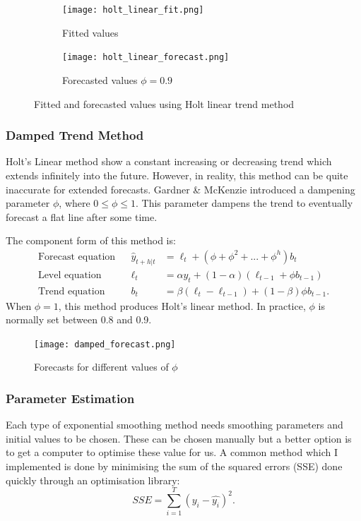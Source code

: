 \documentclass{article}
\begin{document}
  \begin{figure}[H]
    \centering
    \captionsetup{justification=centering}
    \begin{subfigure}[b]{0.49\linewidth}
      \texttt{[image: holt\_linear\_fit.png]}
      \caption{Fitted values}
    \end{subfigure}
    \begin{subfigure}[b]{0.49\linewidth}
      \texttt{[image: holt\_linear\_forecast.png]}
      \caption{Forecasted values $\phi=0.9$}
    \end{subfigure}
    \caption{Fitted and forecasted values using Holt linear trend method}
  \end{figure}

  \subsubsection*{Damped Trend Method}
  Holt's Linear method show a constant increasing or decreasing trend which extends infinitely into the future. However, in reality, this method can be quite inaccurate for extended forecasts. Gardner \& McKenzie introduced a dampening parameter $\phi$, where $0 \le \phi \le 1$. This parameter dampens the trend to eventually forecast a flat line after some time.

  The component form of this method is:
  \begin{align*}
    \text{Forecast equation}&& \hat{y}_{t+h|t} &= \ell_{t} + (\phi+\phi^2+...+\phi^h)b_{t} \\
    \text{Level equation}   && \ell_{t} &= \alpha y_{t} + (1 - \alpha)(\ell_{t-1} + \phi b_{t-1})\\
    \text{Trend equation}   && b_{t}    &= \beta(\ell_{t} - \ell_{t-1}) + (1 -\beta)\phi b_{t-1}.
  \end{align*}
  When $\phi=1$, this method produces Holt's linear method. In practice, $\phi$ is normally set between 0.8 and 0.9.

  \begin{figure}[H]
    \centering
    \captionsetup{justification=centering}
    \texttt{[image: damped\_forecast.png]}
    \caption{Forecasts for different values of $\phi$}
  \end{figure}

  \subsubsection{Parameter Estimation}
  Each type of exponential smoothing method needs smoothing parameters and initial values to be chosen. These can be chosen manually but a better option is to get a computer to optimise these value for us. A common method which I implemented is done by minimising the sum of the squared errors (SSE) done quickly through an optimisation library:
  \begin{equation*}
    SSE = \sum^{T}_{i=1}\left(y_i - \hat{y_i}\right)^2.
  \end{equation*}
\end{document}
